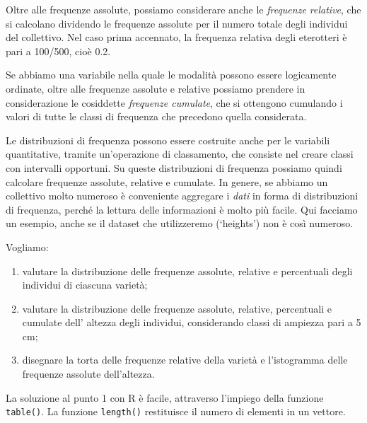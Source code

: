 \documentclass[a4paper,12pt,oneside]{book}
\providecommand{\tightlist}{%
  \setlength{\itemsep}{0pt}\setlength{\parskip}{0pt}}
\newenvironment{Shaded}{\begin{snugshade}}{\end{snugshade}}
\newcommand{\KeywordTok}[1]{\textcolor[rgb]{0.13,0.29,0.53}{\textbf{#1}}}
\newcommand{\DecValTok}[1]{\textcolor[rgb]{0.00,0.00,0.81}{#1}}
\newcommand{\StringTok}[1]{\textcolor[rgb]{0.31,0.60,0.02}{#1}}
\newcommand{\CommentTok}[1]{\textcolor[rgb]{0.56,0.35,0.01}{\textit{#1}}}
\newcommand{\OperatorTok}[1]{\textcolor[rgb]{0.81,0.36,0.00}{\textbf{#1}}}
\newcommand{\NormalTok}[1]{#1}
\theoremstyle{definition}
\theoremstyle{definition}
\theoremstyle{definition}
\theoremstyle{remark}
\begin{document}
Oltre alle frequenze assolute, possiamo considerare anche le
\emph{frequenze relative}, che si calcolano dividendo le frequenze
assolute per il numero totale degli individui del collettivo. Nel caso
prima accennato, la frequenza relativa degli eterotteri è pari a
100/500, cioè 0.2.

Se abbiamo una variabile nella quale le modalità possono essere
logicamente ordinate, oltre alle frequenze assolute e relative possiamo
prendere in considerazione le cosiddette \emph{frequenze cumulate}, che
si ottengono cumulando i valori di tutte le classi di frequenza che
precedono quella considerata.

Le distribuzioni di frequenza possono essere costruite anche per le
variabili quantitative, tramite un'operazione di classamento, che
consiste nel creare classi con intervalli opportuni. Su queste
distribuzioni di frequenza possiamo quindi calcolare frequenze assolute,
relative e cumulate. In genere, se abbiamo un collettivo molto numeroso
è conveniente aggregare i \emph{dati} in forma di distribuzioni di
frequenza, perché la lettura delle informazioni è molto più facile. Qui
facciamo un esempio, anche se il dataset che utilizzeremo (`heights')
non è così numeroso.

Vogliamo:

\begin{enumerate}
\def\labelenumi{\arabic{enumi}.}
\tightlist
\item
  valutare la distribuzione delle frequenze assolute, relative e
  percentuali degli individui di ciascuna varietà;
\item
  valutare la distribuzione delle frequenze assolute, relative,
  percentuali e cumulate dell' altezza degli individui, considerando
  classi di ampiezza pari a 5 cm;
\item
  disegnare la torta delle frequenze relative della varietà e
  l'istogramma delle frequenze assolute dell'altezza.
\end{enumerate}

La soluzione al punto 1 con R è facile, attraverso l'impiego della
funzione \texttt{table()}. La funzione \texttt{length()} restituisce il
numero di elementi in un vettore.

\begin{Shaded}
\end{Shaded}
\end{document}
